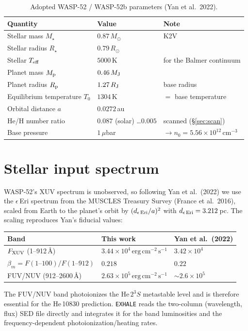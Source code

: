 \documentclass[english,a4paper]{kiseon_memo}
\newcommand{\Rp}{R_{\rm p}}
\newcommand{\FXUV}{F_{\rm XUV}}
\begin{document}
\begin{table}[h]
\centering
\caption{Adopted WASP-52 / WASP-52b parameters (Yan et al.\ 2022).}
\label{tab:params}
\begin{tabular}{lll}
\toprule
Quantity & Value & Note \\
\midrule
Stellar mass $M_\star$        & $0.87\,M_\odot$   & K2V \\
Stellar radius $R_\star$      & $0.79\,R_\odot$   & \\
Stellar $T_{\rm eff}$         & $5000$\,K         & for the Balmer continuum \\
Planet mass $M_{\rm p}$       & $0.46\,M_{\rm J}$ & \\
Planet radius $\Rp$           & $1.27\,R_{\rm J}$ & base radius \\
Equilibrium temperature $T_0$ & $1304$\,K         & $=$ base temperature \\
Orbital distance $a$          & $0.0272$\,au      & \\
He/H number ratio             & $0.087$ (solar) \dots $0.005$ & scanned (\S\ref{sec:scan}) \\
Base pressure                 & $1\,\mu$bar       & $\to n_0=5.56\times10^{12}\,\mathrm{cm^{-3}}$ \\
\bottomrule
\end{tabular}
\end{table}

\section{Stellar input spectrum}
WASP-52's XUV spectrum is unobserved, so following Yan et al.\ (2022) we use the
$\epsilon$\,Eri spectrum from the MUSCLES Treasury Survey (France et al.\ 2016),
scaled from Earth to the planet's orbit by $(d_{\epsilon\,\rm Eri}/a)^2$ with
$d_{\epsilon\,\rm Eri}=3.212$\,pc. The scaling reproduces Yan's fiducial values:
\begin{center}
\begin{tabular}{lll}
\toprule
Band & This work & Yan et al.\ (2022) \\
\midrule
$\FXUV$ (1--912\,\AA)      & $3.44\times10^{4}\,\mathrm{erg\,cm^{-2}\,s^{-1}}$ & $3.42\times10^{4}$ \\
$\beta_m=F(1\text{--}100)/F(1\text{--}912)$ & $0.218$ & $0.22$ \\
FUV/NUV (912--2600\,\AA)   & $2.63\times10^{5}\,\mathrm{erg\,cm^{-2}\,s^{-1}}$ & $\sim2.6\times10^{5}$ \\
\bottomrule
\end{tabular}
\end{center}
The FUV/NUV band photoionizes the He\,$2^3S$ metastable level and is therefore
essential for the He\,10830 prediction. \texttt{EXHALE} reads the two-column
(wavelength, flux) SED file directly and integrates it for the band luminosities
and the frequency-dependent photoionization/heating rates.
\end{document}
